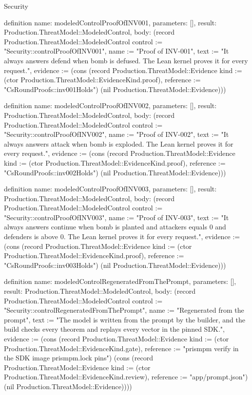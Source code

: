 \begin{lexlean}{Security}
\begin{semanticmodule}
definition{
  name: modeledControlProofOfINV001,
  parameters: [],
  result: Production.ThreatModel::ModeledControl,
  body: (record Production.ThreatModel::ModeledControl {control := "Security::controlProofOfINV001", name := "Proof of INV-001", text := "It always answers defend when bomb is defused. The Lean kernel proves it for every request.", evidence := (cons (record Production.ThreatModel::Evidence {kind := (ctor Production.ThreatModel::EvidenceKind.proof), reference := "CsRoundProofs::inv001Holds"}) (nil Production.ThreatModel::Evidence))})
}

definition{
  name: modeledControlProofOfINV002,
  parameters: [],
  result: Production.ThreatModel::ModeledControl,
  body: (record Production.ThreatModel::ModeledControl {control := "Security::controlProofOfINV002", name := "Proof of INV-002", text := "It always answers attack when bomb is exploded. The Lean kernel proves it for every request.", evidence := (cons (record Production.ThreatModel::Evidence {kind := (ctor Production.ThreatModel::EvidenceKind.proof), reference := "CsRoundProofs::inv002Holds"}) (nil Production.ThreatModel::Evidence))})
}

definition{
  name: modeledControlProofOfINV003,
  parameters: [],
  result: Production.ThreatModel::ModeledControl,
  body: (record Production.ThreatModel::ModeledControl {control := "Security::controlProofOfINV003", name := "Proof of INV-003", text := "It always answers continue when bomb is planted and attackers equals 0 and defenders is above 0. The Lean kernel proves it for every request.", evidence := (cons (record Production.ThreatModel::Evidence {kind := (ctor Production.ThreatModel::EvidenceKind.proof), reference := "CsRoundProofs::inv003Holds"}) (nil Production.ThreatModel::Evidence))})
}

definition{
  name: modeledControlRegeneratedFromThePrompt,
  parameters: [],
  result: Production.ThreatModel::ModeledControl,
  body: (record Production.ThreatModel::ModeledControl {control := "Security::controlRegeneratedFromThePrompt", name := "Regenerated from the prompt", text := "The model is written from the prompt by the builder, and the build checks every theorem and replays every vector in the pinned SDK.", evidence := (cons (record Production.ThreatModel::Evidence {kind := (ctor Production.ThreatModel::EvidenceKind.gate), reference := "prismpm verify in the SDK image prismpm.lock pins"}) (cons (record Production.ThreatModel::Evidence {kind := (ctor Production.ThreatModel::EvidenceKind.review), reference := "app/prompt.json"}) (nil Production.ThreatModel::Evidence)))})
}


\end{semanticmodule}
\end{lexlean}
